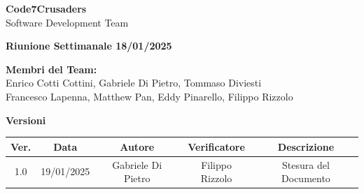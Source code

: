 \documentclass{article}
\begin{document}
\begin{titlepage}
    {\Huge \textbf{Code7Crusaders}}\\
    \vspace{0.5cm}
    {\Large Software Development Team}\\
    \vspace{2cm}
        
        {\large \textbf{Riunione Settimanale 18/01/2025}}\\
    \vspace{5cm}                           %
    
    
    \textbf{Membri del Team:}\\
    Enrico Cotti Cottini, Gabriele Di Pietro, Tommaso Diviesti \\
    Francesco Lapenna, Matthew Pan, Eddy Pinarello, Filippo Rizzolo \\
    \vspace{0.5cm}
    
    \vspace{1cm}
\end{titlepage}



\newpage
\begin{table}[h!]
\centering
\textbf{Versioni} \\ %
\vspace{2mm} %
\begin{tabular}{|c|c|c|c|c|}
    \hline
    \textbf{Ver.} & \textbf{Data} & \textbf{Autore} & \textbf{Verificatore} & \textbf{Descrizione} \\
    \hline
    1.0 & 19/01/2025 & Gabriele Di Pietro & Filippo Rizzolo & Stesura del Documento \\ 
    \hline                                  %
\end{tabular}
\end{table}



\newpage
\end{document}
